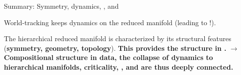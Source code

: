     
  
  
  

 

\begin{frame}[label=ladila]{Summary: Symmetry, dynamics, \K, and \SEP}

World-tracking keeps dynamics on the reduced manifold (leading to \SEP!). \vfill 
 
The hierarchical reduced manifold is characterized by its structural features (\textbf{symmetry, geometry, topology}). \textbf{This provides the structure in \SEP.}
\vfill
   \textbf{$\longrightarrow$ Compositional structure in data, the collapse of dynamics to hierarchical manifolds,  criticality,  \K, and \SEP are thus deeply connected.} \vfill 

\end{frame}
